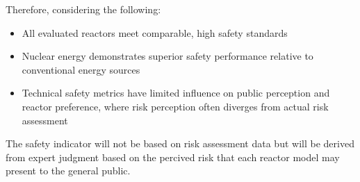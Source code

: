 
Therefore, considering the following:
\begin{itemize}
    \item All evaluated reactors meet comparable, high safety standards
    \item Nuclear energy demonstrates superior safety performance relative to conventional energy sources
    \item Technical safety metrics have limited influence on public perception and reactor preference, where risk perception often diverges from actual risk assessment
\end{itemize}

The safety indicator will not be based on risk assessment data but will be derived from expert judgment based on the percived risk that each reactor model may present to the general public.
